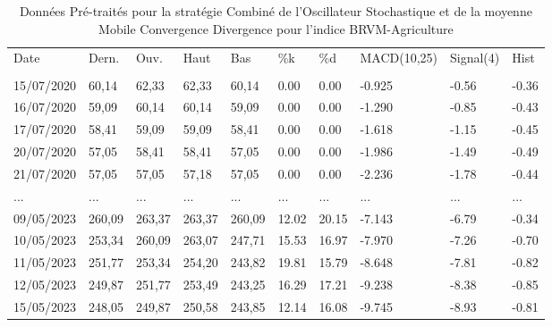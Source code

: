 \hypertarget{tab:multirow}{}
\begin{longtable}[]{@{}llllllllll@{}}
\caption{Données Pré-traités pour la stratégie Combiné de l'Oscillateur
Stochastique et de la moyenne Mobile Convergence Divergence pour
l'indice BRVM-Agriculture}\tabularnewline
\toprule\noalign{}
\endfirsthead
\endhead
\bottomrule\noalign{}
\endlastfoot
Date & Dern. & Ouv. & Haut & Bas & \%k & \%d & MACD(10,25) & Signal(4) &
Hist \\
& & & & & & & & & \\
15/07/2020 & 60,14 & 62,33 & 62,33 & 60,14 & 0.00 & 0.00 & -0.925 &
-0.56 & -0.36 \\
16/07/2020 & 59,09 & 60,14 & 60,14 & 59,09 & 0.00 & 0.00 & -1.290 &
-0.85 & -0.43 \\
17/07/2020 & 58,41 & 59,09 & 59,09 & 58,41 & 0.00 & 0.00 & -1.618 &
-1.15 & -0.45 \\
20/07/2020 & 57,05 & 58,41 & 58,41 & 57,05 & 0.00 & 0.00 & -1.986 &
-1.49 & -0.49 \\
21/07/2020 & 57,05 & 57,05 & 57,18 & 57,05 & 0.00 & 0.00 & -2.236 &
-1.78 & -0.44 \\
... & ... & ... & ... & ... & ... & ... & ... & ... & ... \\
09/05/2023 & 260,09 & 263,37 & 263,37 & 260,09 & 12.02 & 20.15 & -7.143
& -6.79 & -0.34 \\
10/05/2023 & 253,34 & 260,09 & 263,07 & 247,71 & 15.53 & 16.97 & -7.970
& -7.26 & -0.70 \\
11/05/2023 & 251,77 & 253,34 & 254,20 & 243,82 & 19.81 & 15.79 & -8.648
& -7.81 & -0.82 \\
12/05/2023 & 249,87 & 251,77 & 253,49 & 243,25 & 16.29 & 17.21 & -9.238
& -8.38 & -0.85 \\
15/05/2023 & 248,05 & 249,87 & 250,58 & 243,85 & 12.14 & 16.08 & -9.745
& -8.93 & -0.81 \\
\end{longtable}

